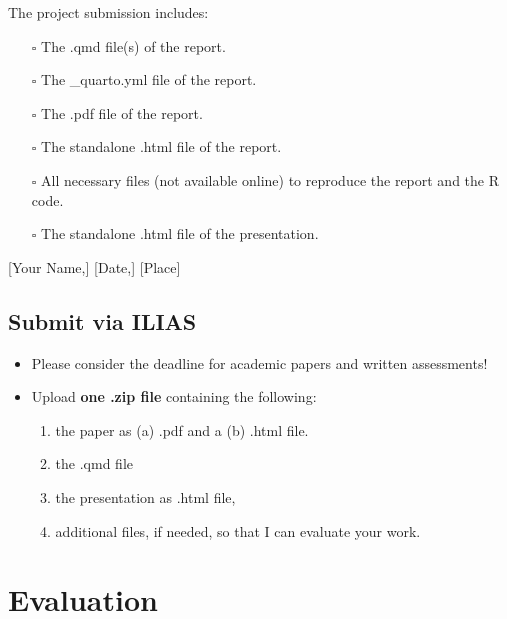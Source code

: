 \documentclass[
  a4paper,
  onecolumn,
  oneside]{scrartcl}
\providecommand{\tightlist}{%
  \setlength{\itemsep}{0pt}\setlength{\parskip}{0pt}}\usepackage{longtable,booktabs,array}
\begin{document}
\begin{tcolorbox}[enhanced jigsaw, arc=.35mm, colback=white, opacityback=0, left=2mm, breakable, rightrule=.15mm, bottomrule=.15mm, leftrule=.75mm, toprule=.15mm, colframe=quarto-callout-tip-color-frame]
The project submission includes:

\begin{itemize}
\tightlist
\item[$\square$]
  The .qmd file(s) of the report.
\item[$\square$]
  The \_quarto.yml file of the report.
\item[$\square$]
  The .pdf file of the report.
\item[$\square$]
  The standalone .html file of the report.
\item[$\square$]
  All necessary files (not available online) to reproduce the report and
  the R code.
\item[$\square$]
  The standalone .html file of the presentation.
\end{itemize}

{[}Your Name,{]} {[}Date,{]} {[}Place{]}

\end{tcolorbox}

\subsection{Submit via ILIAS}\label{submit-via-ilias}

\begin{itemize}
\tightlist
\item
  Please consider the deadline for academic papers and written
  assessments!
\item
  Upload \textbf{one .zip file} containing the following:

  \begin{enumerate}
  \def\labelenumi{\arabic{enumi}.}
  \tightlist
  \item
    the paper as (a) .pdf and a (b) .html file.
  \item
    the .qmd file
  \item
    the presentation as .html file,
  \item
    additional files, if needed, so that I can evaluate your work.
  \end{enumerate}
\end{itemize}

\section{Evaluation}\label{evaluation}
\end{document}
